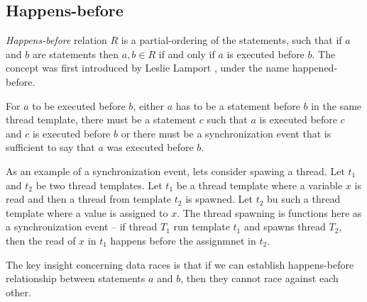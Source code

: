 \documentclass[..thesis.tex]{subfiles}
\begin{document}
\subsection{Happens-before}

\textit{Happens-before} relation $R$ is a partial-ordering of the statements, such that if $a$ and $b$ are statements then $a,b \in R$ if and only if $a$ is executed before $b$.
The concept was first introduced by Leslie Lamport \cite{lamport_time_1978}, under the name happened-before.

For $a$ to be executed before $b$, either $a$ has to be a statement before $b$ in the same thread template,
there must be a statement $c$ such that $a$ is executed before $c$ and $c$ is executed before $b$ or
there must be a synchronization event that is sufficient to say that $a$ was executed before $b$.

As an example of a synchronization event, lets consider spawing a thread. Let $t_1$ and $t_2$ be two thread templates.
Let $t_1$ be a thread template where a variable $x$ is read and then a thread from template $t_2$ is spawned.
Let $t_2$ bu such a thread template where a value is assigned to $x$. The thread spawning is functions here as a synchronization event -- 
if thread $T_1$ run template $t_1$ and spawns thread $T_2$, then the read of $x$ in $t_1$ happens before the assignmnet in $t_2$.

The key insight concerning data races is that if we can establish happens-before relationship between statements $a$ and $b$, then they cannot race against each other. 
\end{document}
